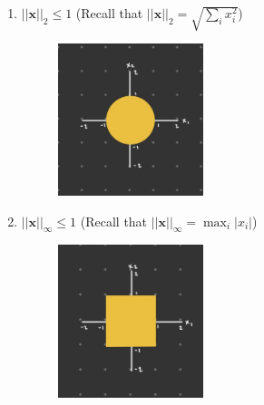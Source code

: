 \documentclass[a4paper]{article}
\theoremstyle{definition}
\newenvironment{soln}{
	\leavevmode\color{blue}\ignorespaces
}{}
\begin{document}
\begin{enumerate}
		\item 	$||\mathbf{x}||_2 \leq 1$ (Recall that $||\mathbf{x}||_2 =\sqrt{\sum_i x_i^2}$)
			\begin{soln}
			\begin{figure}[h!]
			    \centering
			    \includegraphics[width=0.4\textwidth]{plots/l2_norm.jpeg}
			    \captionsetup{labelformat=empty}
			    \caption{}
			    \label{fig:l2_norm}
			\end{figure}
		\end{soln}
		\item 	$||\mathbf{x}||_\infty \leq 1$ (Recall that $||\mathbf{x}||_\infty = \max_i |x_i|$)
			\begin{soln}
			\begin{figure}[h!]
			    \centering
			    \includegraphics[width=0.4\textwidth]{plots/linf_norm.jpeg}
			    \captionsetup{labelformat=empty}
			    \caption{}
			    \label{fig:inf_norm}
			\end{figure}
		\end{soln}
	\end{enumerate}
	
\end{document}
